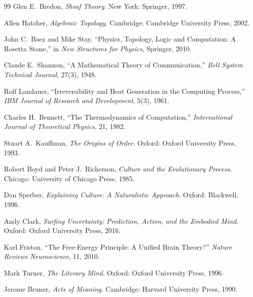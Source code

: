 \documentclass[12pt, oneside]{article}
\theoremstyle{plain}
\theoremstyle{definition}
\theoremstyle{remark}
\begin{document}
\begin{thebibliography}{99}
Glen E.\ Bredon,
\textit{Sheaf Theory}.
New York: Springer, 1997.

Allen Hatcher,
\textit{Algebraic Topology}.
Cambridge: Cambridge University Press, 2002.

John C.\ Baez and Mike Stay,
``Physics, Topology, Logic and Computation: A Rosetta Stone,''
in \textit{New Structures for Physics}, Springer, 2010.

Claude E.\ Shannon,
``A Mathematical Theory of Communication,''
\textit{Bell System Technical Journal}, 27(3), 1948.

Rolf Landauer,
``Irreversibility and Heat Generation in the Computing Process,''
\textit{IBM Journal of Research and Development}, 5(3), 1961.

Charles H.\ Bennett,
``The Thermodynamics of Computation,''
\textit{International Journal of Theoretical Physics}, 21, 1982.

Stuart A.\ Kauffman,
\textit{The Origins of Order}.
Oxford: Oxford University Press, 1993.

Robert Boyd and Peter J.\ Richerson,
\textit{Culture and the Evolutionary Process}.
Chicago: University of Chicago Press, 1985.

Dan Sperber,
\textit{Explaining Culture: A Naturalistic Approach}.
Oxford: Blackwell, 1996.

Andy Clark,
\textit{Surfing Uncertainty: Prediction, Action, and the Embodied Mind}.
Oxford: Oxford University Press, 2016.

Karl Friston,
``The Free-Energy Principle: A Unified Brain Theory?''
\textit{Nature Reviews Neuroscience}, 11, 2010.

Mark Turner,
\textit{The Literary Mind}.
Oxford: Oxford University Press, 1996.

Jerome Bruner,
\textit{Acts of Meaning}.
Cambridge: Harvard University Press, 1990.

\end{thebibliography}
\end{document}
